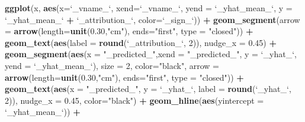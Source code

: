 \documentclass[]{krantz}
\newenvironment{Shaded}{\begin{snugshade}}{\end{snugshade}}
\newcommand{\DataTypeTok}[1]{\textcolor[rgb]{0.13,0.29,0.53}{#1}}
\newcommand{\DecValTok}[1]{\textcolor[rgb]{0.00,0.00,0.81}{#1}}
\newcommand{\FloatTok}[1]{\textcolor[rgb]{0.00,0.00,0.81}{#1}}
\newcommand{\KeywordTok}[1]{\textcolor[rgb]{0.13,0.29,0.53}{\textbf{#1}}}
\newcommand{\NormalTok}[1]{#1}
\newcommand{\OperatorTok}[1]{\textcolor[rgb]{0.81,0.36,0.00}{\textbf{#1}}}
\newcommand{\StringTok}[1]{\textcolor[rgb]{0.31,0.60,0.02}{#1}}
\theoremstyle{definition}
\theoremstyle{definition}
\theoremstyle{definition}
\theoremstyle{remark}
\begin{document}
\begin{Shaded}
\begin{Highlighting}[]
\KeywordTok{ggplot}\NormalTok{(x, }\KeywordTok{aes}\NormalTok{(}\DataTypeTok{x=}\StringTok{`}\DataTypeTok{_vname_}\StringTok{`}\NormalTok{, }\DataTypeTok{xend=}\StringTok{`}\DataTypeTok{_vname_}\StringTok{`}\NormalTok{, }
              \DataTypeTok{yend =} \StringTok{`}\DataTypeTok{_yhat_mean_}\StringTok{`}\NormalTok{, }\DataTypeTok{y =} \StringTok{`}\DataTypeTok{_yhat_mean_}\StringTok{`} \OperatorTok{+}\StringTok{ `}\DataTypeTok{_attribution_}\StringTok{`}\NormalTok{, }
              \DataTypeTok{color=}\StringTok{`}\DataTypeTok{_sign_}\StringTok{`}\NormalTok{)) }\OperatorTok{+}
\StringTok{  }\KeywordTok{geom_segment}\NormalTok{(}\DataTypeTok{arrow =} \KeywordTok{arrow}\NormalTok{(}\DataTypeTok{length=}\KeywordTok{unit}\NormalTok{(}\FloatTok{0.30}\NormalTok{,}\StringTok{"cm"}\NormalTok{), }\DataTypeTok{ends=}\StringTok{"first"}\NormalTok{, }\DataTypeTok{type =} \StringTok{"closed"}\NormalTok{)) }\OperatorTok{+}\StringTok{ }
\StringTok{  }\KeywordTok{geom_text}\NormalTok{(}\KeywordTok{aes}\NormalTok{(}\DataTypeTok{label =} \KeywordTok{round}\NormalTok{(}\StringTok{`}\DataTypeTok{_attribution_}\StringTok{`}\NormalTok{, }\DecValTok{2}\NormalTok{)), }\DataTypeTok{nudge_x =} \FloatTok{0.45}\NormalTok{) }\OperatorTok{+}
\StringTok{  }\KeywordTok{geom_segment}\NormalTok{(}\KeywordTok{aes}\NormalTok{(}\DataTypeTok{x =} \StringTok{"_predicted_"}\NormalTok{,}\DataTypeTok{xend =} \StringTok{"_predicted_"}\NormalTok{,}
                   \DataTypeTok{y =} \StringTok{`}\DataTypeTok{_yhat_}\StringTok{`}\NormalTok{, }\DataTypeTok{yend =} \StringTok{`}\DataTypeTok{_yhat_mean_}\StringTok{`}\NormalTok{), }\DataTypeTok{size =} \DecValTok{2}\NormalTok{, }\DataTypeTok{color=}\StringTok{"black"}\NormalTok{,}
               \DataTypeTok{arrow =} \KeywordTok{arrow}\NormalTok{(}\DataTypeTok{length=}\KeywordTok{unit}\NormalTok{(}\FloatTok{0.30}\NormalTok{,}\StringTok{"cm"}\NormalTok{), }\DataTypeTok{ends=}\StringTok{"first"}\NormalTok{, }\DataTypeTok{type =} \StringTok{"closed"}\NormalTok{)) }\OperatorTok{+}\StringTok{ }
\StringTok{  }\KeywordTok{geom_text}\NormalTok{(}\KeywordTok{aes}\NormalTok{(}\DataTypeTok{x =} \StringTok{"_predicted_"}\NormalTok{, }
                \DataTypeTok{y =} \StringTok{`}\DataTypeTok{_yhat_}\StringTok{`}\NormalTok{, }\DataTypeTok{label =} \KeywordTok{round}\NormalTok{(}\StringTok{`}\DataTypeTok{_yhat_}\StringTok{`}\NormalTok{, }\DecValTok{2}\NormalTok{)), }\DataTypeTok{nudge_x =} \FloatTok{0.45}\NormalTok{, }\DataTypeTok{color=}\StringTok{"black"}\NormalTok{) }\OperatorTok{+}
\StringTok{  }\KeywordTok{geom_hline}\NormalTok{(}\KeywordTok{aes}\NormalTok{(}\DataTypeTok{yintercept =} \StringTok{`}\DataTypeTok{_yhat_mean_}\StringTok{`}\NormalTok{)) }\OperatorTok{+}\StringTok{ }

\end{Highlighting}
\end{Shaded}
\end{document}
